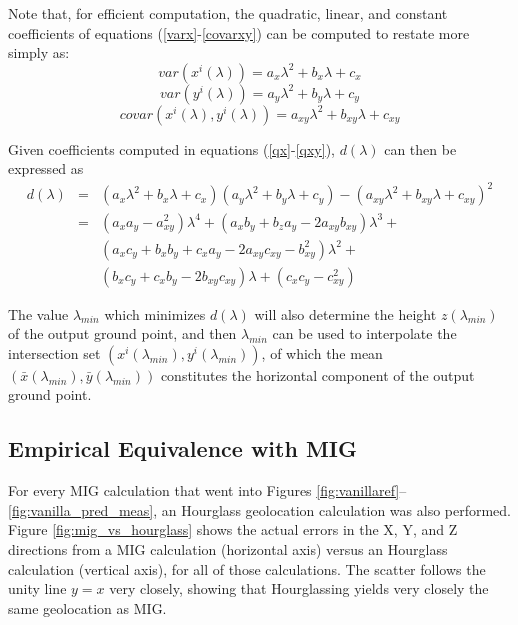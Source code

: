 \documentclass[10pt]{amsart}
\begin{document}
Note that, for efficient computation, the quadratic, linear, and
constant coefficients of equations (\ref{varx}-\ref{covarxy}) can be
computed to restate more simply as:
\begin{equation}\label{qx}
var(x^i(\lambda)) = a_x\lambda^2 + b_x\lambda + c_x
\end{equation}
\begin{equation}\label{qy}
var(y^i(\lambda)) = a_y\lambda^2 + b_y\lambda + c_y
\end{equation}
\begin{equation}\label{qxy}
covar(x^i(\lambda),y^i(\lambda)) = a_{xy}\lambda^2 + b_{xy}\lambda + c_{xy}
\end{equation}

Given coefficients computed in equations (\ref{qx}-\ref{qxy}),
$d(\lambda)$ can then be expressed as
\begin{eqnarray}\label{d}
d(\lambda) &=& (a_x\lambda^2 + b_x\lambda + c_x)(a_y\lambda^2 + b_y\lambda + c_y) - 
(a_{xy}\lambda^2 + b_{xy}\lambda + c_{xy})^2 \nonumber \\
&=& (a_xa_y-a_{xy}^2)\lambda^4 + (a_xb_y+b_za_y-2a_{xy}b_{xy})\lambda^3 + \nonumber \\
&& (a_xc_y+b_xb_y+c_xa_y-2a_{xy}c_{xy}-b^2_{xy})\lambda^2 +\\
&& (b_xc_y+c_xb_y-2b_{xy}c_{xy})\lambda + (c_xc_y-c^2_{xy}) \nonumber
\end{eqnarray}

The value $\lambda_{min}$ which minimizes $d(\lambda)$ will also determine the
height $z(\lambda_{min})$ of the output ground point, and then $\lambda_{min}$
can be used to interpolate the intersection set
$(x^i(\lambda_{min}), y^i(\lambda_{min}))$, of which the mean
$(\bar{x}(\lambda_{min}), \bar{y}(\lambda_{min}))$ constitutes the horizontal
component of the output ground point.

\subsection{Empirical Equivalence with MIG}
For every MIG calculation that went into Figures
\ref{fig:vanillaref}--\ref{fig:vanilla_pred_meas}, an Hourglass geolocation
calculation was also performed. Figure \ref{fig:mig_vs_hourglass} shows the
actual errors in the X, Y, and Z directions from a MIG calculation (horizontal
axis) versus an Hourglass calculation (vertical axis), for all of those
calculations. The scatter follows the unity line $y=x$ very closely, showing
that Hourglassing yields very closely the same geolocation as MIG.
\end{document}
